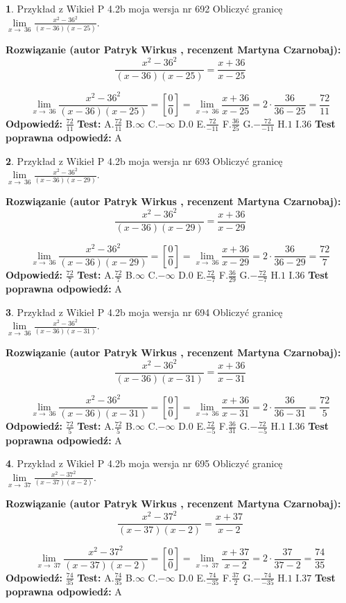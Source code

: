 \documentclass[12pt, a4paper]{article}
\theoremstyle{definition} %
\newtheorem{zad}{}
\newcommand{\zadStart}[1]{\begin{zad}#1\newline}
\newcommand{\zadStop}{\end{zad}}
\newcommand{\rozwStart}[2]{\noindent \textbf{Rozwiązanie (autor #1 , recenzent #2): }\newline}
\newcommand{\rozwStop}{\newline}
\newcommand{\odpStart}{\noindent \textbf{Odpowiedź:}\newline}
\newcommand{\odpStop}{\newline}
\newcommand{\testStart}{\noindent \textbf{Test:}\newline}
\newcommand{\testStop}{\newline}
\newcommand{\kluczStart}{\noindent \textbf{Test poprawna odpowiedź:}\newline}
\newcommand{\kluczStop}{\newline}
\begin{document}
\zadStart{Przykład z Wikieł P 4.2b moja wersja nr 692}
Obliczyć granicę $\lim\limits_{x\to\ 36}\frac{x^{2}-36^{2}}{(x-36)(x-25)}$.
\zadStop
\rozwStart{Patryk Wirkus}{Martyna Czarnobaj}
$$\frac{x^{2}-36^{2}}{(x-36)(x-25)}=\frac{x+36}{x-25}$$

$$\lim\limits_{x\to\ 36}\frac{x^{2}-36^{2}}{(x-36)(x-25)}=[\frac{0}{0}]=\lim\limits_{x\to\ 36}\frac{x+36}{x-25}=2 \cdot \frac{36}{36-25} = \frac{72}{11}$$
\rozwStop
\odpStart
$\frac{72}{11}$
\odpStop
\testStart
A.$\frac{72}{11}$
B.$\infty$
C.$-\infty$
D.$0$
E.$\frac{72}{-11}$
F.$\frac{36}{25}$
G.$-\frac{72}{-11}$
H.$1$
I.$36$
\testStop
\kluczStart
A
\kluczStop



\zadStart{Przykład z Wikieł P 4.2b moja wersja nr 693}
Obliczyć granicę $\lim\limits_{x\to\ 36}\frac{x^{2}-36^{2}}{(x-36)(x-29)}$.
\zadStop
\rozwStart{Patryk Wirkus}{Martyna Czarnobaj}
$$\frac{x^{2}-36^{2}}{(x-36)(x-29)}=\frac{x+36}{x-29}$$

$$\lim\limits_{x\to\ 36}\frac{x^{2}-36^{2}}{(x-36)(x-29)}=[\frac{0}{0}]=\lim\limits_{x\to\ 36}\frac{x+36}{x-29}=2 \cdot \frac{36}{36-29} = \frac{72}{7}$$
\rozwStop
\odpStart
$\frac{72}{7}$
\odpStop
\testStart
A.$\frac{72}{7}$
B.$\infty$
C.$-\infty$
D.$0$
E.$\frac{72}{-7}$
F.$\frac{36}{29}$
G.$-\frac{72}{-7}$
H.$1$
I.$36$
\testStop
\kluczStart
A
\kluczStop



\zadStart{Przykład z Wikieł P 4.2b moja wersja nr 694}
Obliczyć granicę $\lim\limits_{x\to\ 36}\frac{x^{2}-36^{2}}{(x-36)(x-31)}$.
\zadStop
\rozwStart{Patryk Wirkus}{Martyna Czarnobaj}
$$\frac{x^{2}-36^{2}}{(x-36)(x-31)}=\frac{x+36}{x-31}$$

$$\lim\limits_{x\to\ 36}\frac{x^{2}-36^{2}}{(x-36)(x-31)}=[\frac{0}{0}]=\lim\limits_{x\to\ 36}\frac{x+36}{x-31}=2 \cdot \frac{36}{36-31} = \frac{72}{5}$$
\rozwStop
\odpStart
$\frac{72}{5}$
\odpStop
\testStart
A.$\frac{72}{5}$
B.$\infty$
C.$-\infty$
D.$0$
E.$\frac{72}{-5}$
F.$\frac{36}{31}$
G.$-\frac{72}{-5}$
H.$1$
I.$36$
\testStop
\kluczStart
A
\kluczStop



\zadStart{Przykład z Wikieł P 4.2b moja wersja nr 695}
Obliczyć granicę $\lim\limits_{x\to\ 37}\frac{x^{2}-37^{2}}{(x-37)(x-2)}$.
\zadStop
\rozwStart{Patryk Wirkus}{Martyna Czarnobaj}
$$\frac{x^{2}-37^{2}}{(x-37)(x-2)}=\frac{x+37}{x-2}$$

$$\lim\limits_{x\to\ 37}\frac{x^{2}-37^{2}}{(x-37)(x-2)}=[\frac{0}{0}]=\lim\limits_{x\to\ 37}\frac{x+37}{x-2}=2 \cdot \frac{37}{37-2} = \frac{74}{35}$$
\rozwStop
\odpStart
$\frac{74}{35}$
\odpStop
\testStart
A.$\frac{74}{35}$
B.$\infty$
C.$-\infty$
D.$0$
E.$\frac{74}{-35}$
F.$\frac{37}{2}$
G.$-\frac{74}{-35}$
H.$1$
I.$37$
\testStop
\kluczStart
A
\kluczStop
\end{document}
